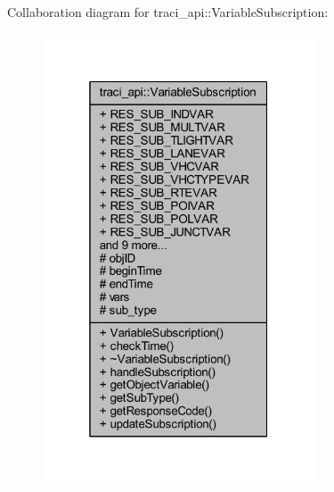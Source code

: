 Collaboration diagram for traci\+\_\+api\+:\+:Variable\+Subscription\+:
\nopagebreak
\begin{figure}[H]
\begin{center}
\leavevmode
\includegraphics[width=229pt]{classtraci__api_1_1_variable_subscription__coll__graph}
\end{center}
\end{figure}

